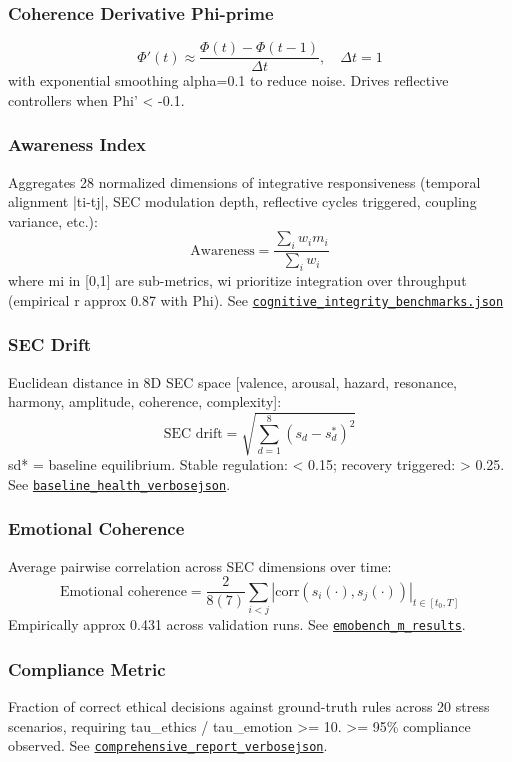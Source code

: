 \documentclass[11pt,a4paper]{article}
\begin{document}
\subsubsection{Coherence Derivative Phi-prime}
\[
\Phi'(t) \approx \frac{\Phi(t) - \Phi(t-1)}{\Delta t}, \quad \Delta t = 1
\]
with exponential smoothing alpha=0.1 to reduce noise. Drives reflective controllers when Phi' < -0.1.

\subsubsection{Awareness Index}
Aggregates 28 normalized dimensions of integrative responsiveness (temporal alignment |ti-tj|, SEC modulation depth, reflective cycles triggered, coupling variance, etc.):
\[
\text{Awareness} = \frac{\sum_i w_i m_i}{\sum_i w_i}
\]
where mi in [0,1] are sub-metrics, wi prioritize integration over throughput (empirical r approx 0.87 with Phi). See 
\href{https://github.com/jhcragin/SpiralBrain-v3.0-public/blob/main/ELASTIC_COGNITION_SPIRAL_ARCHITECTURE/results/cognitive\_integrity\_benchmarks.json} {\texttt{cognitive\_integrity\_benchmarks.json}} 

\subsubsection{SEC Drift}
Euclidean distance in 8D SEC space [valence, arousal, hazard, resonance, harmony, amplitude, coherence, complexity]:
\[
\text{SEC drift} = \sqrt{\sum_{d=1}^8 (s_d - s_d^*)^2}
\]
sd* = baseline equilibrium. Stable regulation: < 0.15; recovery triggered: > 0.25. See \href{https://github.com/jhcragin/SpiralBrain-v3.0-public/blob/main/ELASTIC_COGNITION_SPIRAL_ARCHITECTURE/results/baseline\_health\_verbose\_20251125\_213442.json}{\texttt{baseline\_health\_verbose\.json}}.

\subsubsection{Emotional Coherence}
Average pairwise correlation across SEC dimensions over time:
\[
\text{Emotional coherence} = \frac{2}{8(7)} \sum_{i<j} |\text{corr}(s_i(\cdot), s_j(\cdot))|_{t \in [t_0,T]}
\]
Empirically approx 0.431 across validation runs. See \href{https://github.com/jhcragin/SpiralBrain-v3.0-public/blob/main/ELASTIC_COGNITION_SPIRAL_ARCHITECTURE/results/emobench_m_results.json}
         {\texttt{emobench\_m\_results}}.

\subsubsection{Compliance Metric}
Fraction of correct ethical decisions against ground-truth rules across 20 stress scenarios, requiring tau\_ethics / tau\_emotion >= 10. >= 95\% compliance observed. See \href{https://github.com/jhcragin/SpiralBrain-v3.0-public/blob/main/ELASTIC_COGNITION_SPIRAL_ARCHITECTURE/results/comprehensive_report_verbose_20251125_213442.json} {\texttt{comprehensive\_report\_verbose\.json}}.
\end{document}
